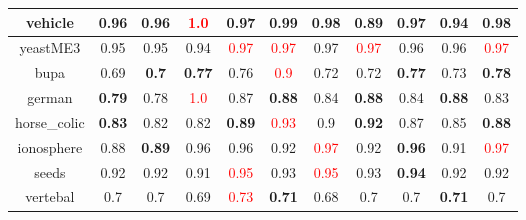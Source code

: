 \documentclass{article}%
\begin{document}
\begin{tabular}{c|cccccccccc}
\hline%
vehicle&0.96&0.96&\textcolor{red}{ 
1.0
}&0.97&\textbf{0.99}&0.98&0.89&\textbf{0.97}&0.94&\textbf{0.98}\\%
\hline%
yeastME3&0.95&0.95&0.94&\textcolor{red}{ 
0.97
}&\textcolor{red}{ 
0.97
}&0.97&\textcolor{red}{ 
0.97
}&0.96&0.96&\textcolor{red}{ 
0.97
}\\%
\hline%
bupa&0.69&\textbf{0.7}&\textbf{0.77}&0.76&\textcolor{red}{ 
0.9
}&0.72&0.72&\textbf{0.77}&0.73&\textbf{0.78}\\%
\hline%
german&\textbf{0.79}&0.78&\textcolor{red}{ 
1.0
}&0.87&\textbf{0.88}&0.84&\textbf{0.88}&0.84&\textbf{0.88}&0.83\\%
\hline%
horse\_colic&\textbf{0.83}&0.82&0.82&\textbf{0.89}&\textcolor{red}{ 
0.93
}&0.9&\textbf{0.92}&0.87&0.85&\textbf{0.88}\\%
\hline%
ionosphere&0.88&\textbf{0.89}&0.96&0.96&0.92&\textcolor{red}{ 
0.97
}&0.92&\textbf{0.96}&0.91&\textcolor{red}{ 
0.97
}\\%
\hline%
seeds&0.92&0.92&0.91&\textcolor{red}{ 
0.95
}&0.93&\textcolor{red}{ 
0.95
}&0.93&\textbf{0.94}&0.92&0.92\\%
\hline%
vertebal&0.7&0.7&0.69&\textcolor{red}{ 
0.73
}&\textbf{0.71}&0.68&0.7&0.7&\textbf{0.71}&0.7\\%
\hline%
\end{tabular}

%
\end{document}
